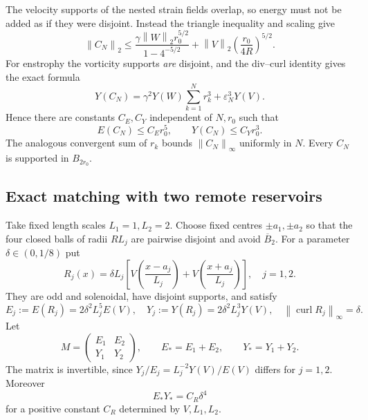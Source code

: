 \documentclass[11pt]{article}
\theoremstyle{remark}
\newcommand{\curl}{\operatorname{curl}}
\newcommand{\norm}[1]{\left\lVert#1\right\rVert}
\begin{document}
The velocity supports of the nested strain fields overlap, so energy
must not be added as if they were disjoint. Instead the triangle inequality
and scaling give
\begin{equation}
 \norm{C_N}_2\le
 \frac{\gamma\norm W_2 r_0^{5/2}}{1-4^{-5/2}}
       +\norm V_2\left(\frac{r_0}{4R}\right)^{5/2}.
 \label{eq:central-energy}
\end{equation}
For enstrophy the vorticity supports \emph{are} disjoint, and the div--curl
identity gives the exact formula
\begin{equation}
 Y(C_N)=\gamma^2Y(W)\sum_{k=1}^N r_k^3
                         +\varepsilon_N^3Y(V).
 \label{eq:central-enstrophy}
\end{equation}
Hence there are constants $C_E,C_Y$ independent of $N,r_0$ such that
\begin{equation}
 E(C_N)\le C_Er_0^5,\qquad Y(C_N)\le C_Yr_0^3.
 \label{eq:central-small}
\end{equation}
The analogous convergent sum of $r_k$ bounds $\norm{C_N}_\infty$
uniformly in $N$. Every $C_N$ is supported in $B_{2r_0}$.

\subsection{Exact matching with two remote reservoirs}
Take fixed length scales $L_1=1,L_2=2$. Choose fixed centres
$\pm a_1,\pm a_2$ so that the four closed balls of radii $RL_j$ are
pairwise disjoint and avoid $\overline B_2$. For a parameter
$\delta\in(0,1/8)$ put
\begin{equation}
 R_j(x)=\delta L_j
 \left[V\left(\frac{x-a_j}{L_j}\right)
       +V\left(\frac{x+a_j}{L_j}\right)\right],\quad j=1,2.
 \label{eq:reservoirs}
\end{equation}
They are odd and solenoidal, have disjoint supports, and satisfy
\begin{equation}
 E_j:=E(R_j)=2\delta^2L_j^5 E(V),\quad
 Y_j:=Y(R_j)=2\delta^2L_j^3 Y(V),\quad
 \norm{\curl R_j}_\infty=\delta.
 \label{eq:reservoir-scalars}
\end{equation}
Let
\begin{equation}
 M=\begin{pmatrix}E_1&E_2\\Y_1&Y_2\end{pmatrix},\qquad
 E_*=E_1+E_2,\qquad Y_*=Y_1+Y_2.
\end{equation}
The matrix is invertible, since
$Y_j/E_j=L_j^{-2}Y(V)/E(V)$ differs for $j=1,2$.
Moreover
\begin{equation}
 E_*Y_*=C_R\delta^4\label{eq:reservoir-small}
\end{equation}
for a positive constant $C_R$ determined by $V,L_1,L_2$.
\end{document}
